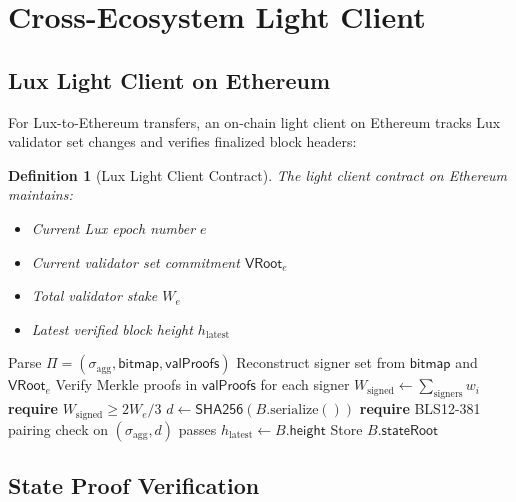 \documentclass[11pt,a4paper]{article}
\newtheorem{definition}{Definition}
\begin{document}
\section{Cross-Ecosystem Light Client}\label{sec:lightclient}

\subsection{Lux Light Client on Ethereum}

For Lux-to-Ethereum transfers, an on-chain light client on Ethereum tracks Lux validator set changes and verifies finalized block headers:

\begin{definition}[Lux Light Client Contract]
The light client contract on Ethereum maintains:
\begin{itemize}
    \item Current Lux epoch number $e$
    \item Current validator set commitment $\mathsf{VRoot}_e$
    \item Total validator stake $W_e$
    \item Latest verified block height $h_{\text{latest}}$
\end{itemize}
\end{definition}

\begin{algorithm}[H]
\caption{Light Client Block Header Verification}
\label{alg:lightclient}
\begin{algorithmic}[1]
    \State Parse $\Pi = (\sigma_{\text{agg}}, \mathsf{bitmap}, \mathsf{valProofs})$
    \State Reconstruct signer set from $\mathsf{bitmap}$ and $\mathsf{VRoot}_e$
    \State Verify Merkle proofs in $\mathsf{valProofs}$ for each signer
    \State $W_{\text{signed}} \gets \sum_{\text{signers}} w_i$
    \State \textbf{require} $W_{\text{signed}} \geq 2W_e/3$
    \State $d \gets \mathsf{SHA256}(B.\text{serialize}())$
    \State \textbf{require} BLS12-381 pairing check on $(\sigma_{\text{agg}}, d)$ passes
    \State $h_{\text{latest}} \gets B.\mathsf{height}$
    \State Store $B.\mathsf{stateRoot}$
\EndProcedure
\end{algorithmic}
\end{algorithm}

\subsection{State Proof Verification}
\end{document}
